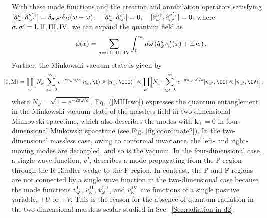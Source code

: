 \documentclass[aps,prd,preprintnumbers,nofootinbib,showpacs]{revtex4}%
\begin{document}
\begin{widetext}
With these mode functions and the creation and annihilation operators satisfying
$[\hat a^{\rm \sigma}_{\omega},\hat a^{\rm \sigma'\dagger}_{\omega'}]=\delta_{\sigma,\sigma'}\delta_D(\omega-\omega), 
~~~
[\hat a^{\rm \sigma}_{\omega},\hat a^{\rm \sigma'}_{\omega'}]=0, 
~~~
[\hat a^{\rm \sigma\dagger}_{\omega},\hat a^{\rm \sigma'\dagger}_{\omega'}]=0,
$
where $\sigma,\sigma'={\rm I,II,III,IV}$, we can expand the quantum field as
\begin{eqnarray}
&&\phi(x)=\sum_{\sigma={\rm I,II,III,IV}}\int_0^\infty d\omega
\left(
\hat a^\sigma_{\omega}v^\sigma_{\omega}(x)+{\rm h.c.}
\right).
\end{eqnarray}
Further, the Minkowski vacuum state is given by
\begin{eqnarray}
\hspace{-5mm}
  |0,{\rm M}\rangle=\prod_\omega\Bigl[
N_\omega\sum_{n_\omega=0}^\infty e^{-\pi n_\omega \omega/a }|n_\omega,{\I}\rangle \otimes|n_\omega,{\III}\rangle
\Bigr]\otimes 
\prod_{\omega'}\Bigl[
N_{\omega'}\sum_{n_{\omega'}=0}^\infty e^{-\pi n_{\omega'} \omega'/a }|n_{\omega'},{\II}\rangle \otimes|n_{\omega'},{\IV}\rangle
\Bigr] ,
\label{MIIItwo}
\end{eqnarray}
where $N_\omega=\sqrt{1-e^{-2\pi \omega/a}}$. %
Eq.~(\ref{MIIItwo}) expresses the quantum entanglement in the Minkowski vacuum 
state of the massless field in two-dimensional Minkowski spacetime, 
which also describes the modes with $\bm k_\perp=0$ in four-dimensional Minkowski spacetime
(see Fig. \ref{fig:coordinate2}). 
In the two-dimensional massless case, owing to conformal invariance, the left- and right-moving modes
are decoupled, and so is the vacuum. In the four-dimensional case, a single wave function, $v^I$, describes
a mode propagating from the P region through the R Rindler wedge to the F region. 
In contrast, the P and F regions are not connected by a single wave function in the two-dimensional case
because the mode functions $v_\omega^{\rm I}$, $v_\omega^{\rm II}$, $v_\omega^{\rm III}$, and $v_\omega^{\rm IV}$
are functions of a single positive variable, $\pm U$ or $\pm V$.  
This is the reason for the absence of quantum radiation in the two-dimensional massless scalar studied 
in Sec.~\ref{Sec:radiation-in-d2}.




\end{widetext}
\end{document}
